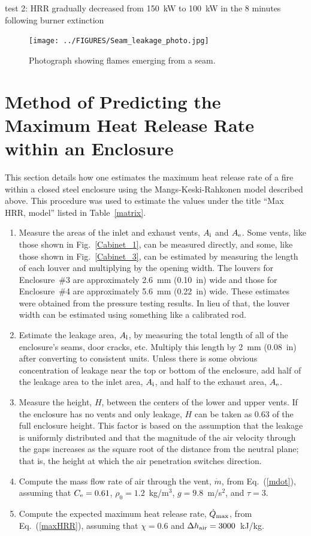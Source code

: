 \documentclass[12pt]{article}
\begin{document}
test 2: HRR gradually decreased from 150~kW to 100~kW in the 8 minutes following burner extinction


\begin{figure}[!ht]
\texttt{[image: ../FIGURES/Seam\_leakage\_photo.jpg]}
\caption[Photograph of flames escaping though a seam]{Photograph showing flames emerging from a seam.}
\label{seam_photo}
\end{figure}

\FloatBarrier

\section{Method of Predicting the Maximum Heat Release Rate within an Enclosure}
\label{method}

This section details how one estimates the maximum heat release rate of a fire within a closed steel enclosure using the Mangs-Keski-Rahkonen model described above. This procedure was used to estimate the values under the title ``Max HRR, model'' listed in Table~\ref{matrix}.
\begin{enumerate}
\item Measure the areas of the inlet and exhaust vents, $A_{\rm i}$ and $A_{\rm e}$. Some vents, like those shown in Fig.~\ref{Cabinet_1}, can be measured directly, and some, like those shown in Fig.~\ref{Cabinet_3}, can be estimated by measuring the length of each louver and multiplying by the opening width. The louvers for Enclosure~\#3 are approximately 2.6~mm (0.10~in) wide and those for Enclosure~\#4 are approximately 5.6~mm (0.22~in) wide. These estimates were obtained from the pressure testing results. In lieu of that, the louver width can be estimated using something like a calibrated rod.
\item Estimate the leakage area, $A_{\rm l}$, by measuring the total length of all of the enclosure's seams, door cracks, etc. Multiply this length by 2~mm (0.08~in) after converting to consistent units. Unless there is some obvious concentration of leakage near the top or bottom of the enclosure, add half of the leakage area to the inlet area, $A_{\rm i}$, and half to the exhaust area, $A_{\rm e}$.
\item Measure the height, $H$, between the centers of the lower and upper vents. If the enclosure has no vents and only leakage, $H$ can be taken as 0.63 of the full enclosure height. This factor is based on the assumption that the leakage is uniformly distributed and that the magnitude of the air velocity through the gaps increases as the square root of the distance from the neutral plane; that is, the height at which the air penetration switches direction.
\item Compute the mass flow rate of air through the vent, $\dot{m}$, from Eq.~(\ref{mdot}), assuming that $C_{\rm e}=0.61$, $\rho_0=1.2$~kg/m$^3$, $g=9.8$~m/s$^2$, and $\tau=3$.
\item Compute the expected maximum heat release rate, $\dot{Q}_{\rm max}$, from Eq.~(\ref{maxHRR}), assuming that $\chi=0.6$ and $\Delta h_{\rm air}=3000$~kJ/kg.
\end{enumerate}
\end{document}
